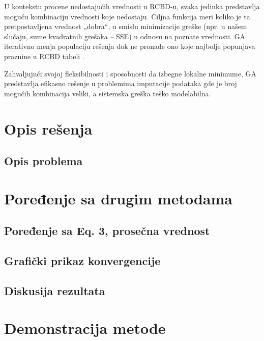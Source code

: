 \documentclass[a4paper,12pt]{article}
\begin{document}
U kontekstu procene nedostajućih vrednosti u RCBD-u, svaka jedinka predstavlja moguću kombinaciju vrednosti koje nedostaju. Ciljna funkcija meri koliko je ta pretpostavljena vrednost „dobra“, u smislu minimizacije greške (npr. u našem slučaju, sume kvadratnih grešaka – SSE) u odnosu na poznate vrednosti. GA iterativno menja populaciju rešenja dok ne pronađe ono koje najbolje popunjava praznine u RCBD tabeli \cite{azadeh2013}.

Zahvaljujući svojoj fleksibilnosti i sposobnosti da izbegne lokalne minimume, GA predstavlja efikasno rešenje u problemima imputacije podataka gde je broj mogućih kombinacija veliki, a sistemska greška teško modelabilna. 


\section{Opis rešenja}
\subsection{Opis problema}

\section{Poređenje sa drugim metodama}
\subsection{Poređenje sa Eq. 3, prosečna vrednost}
\subsection{Grafički prikaz konvergencije}
\subsection{Diskusija rezultata}

\section{Demonstracija metode}
\subsection{}
\subsection{}
\subsection{}
\end{document}
